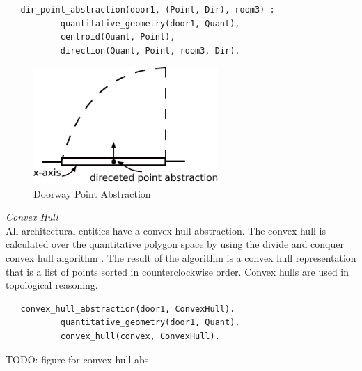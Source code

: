 \documentclass[12pt]{ucthesis}
\begin{document}
\begin{verbatim}
   dir_point_abstraction(door1, (Point, Dir), room3) :-
           quantitative_geometry(door1, Quant),
           centroid(Quant, Point),
           direction(Quant, Point, room3, Dir).
\end{verbatim}

\begin{figure}[H]\label{dir-point-abs}
\centering
\includegraphics[width=70mm]{dir-point-abs}
\caption{Doorway Point Abstraction}
\end{figure}

\noindent \emph{\large Convex Hull} \\
\indent All architectural entities have a convex hull abstraction. The convex hull is calculated over the quantitative polygon space by using the divide and conquer convex hull algorithm \cite{tbd}. The result of the algorithm is a convex hull representation that is a list of points sorted in counterclockwise order. Convex hulls are used in topological reasoning.
\begin{verbatim}
   convex_hull_abstraction(door1, ConvexHull).
           quantitative_geometry(door1, Quant),
           convex_hull(convex, ConvexHull).
\end{verbatim}

TODO: figure for convex hull abs


\clearpage




\end{document}
